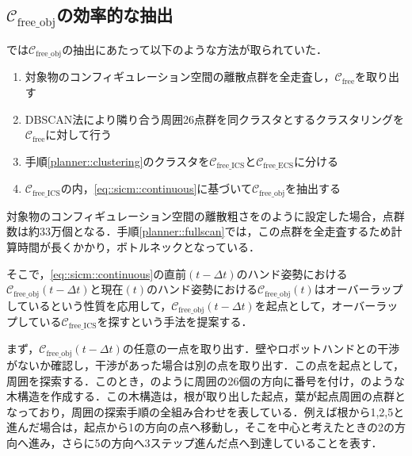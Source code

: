 \documentclass[a4paper,twoside,12pt,papersize, dvipdfmx]{iirthesis}
\begin{document}
\subsection{$\mathcal{C}_{\mathrm{free\_obj}}$の効率的な抽出}\label{subsec::planner::dfs}
\cite{komiyama2021}では$\mathcal{C}_{\mathrm{free\_obj}}$の抽出にあたって以下のような方法が取られていた．
\begin{enumerate}
\item 対象物のコンフィギュレーション空間の離散点群を全走査し，$\mathcal{C}_{\mathrm{free}}$を取り出す \label{planner::fullscan}
\item DBSCAN法\cite{ester1996}により隣り合う周囲26点群を同クラスタとするクラスタリングを$\mathcal{C}_{\mathrm{free}}$に対して行う\label{planner::clustering}
\item 手順\ref{planner::clustering}のクラスタを$\mathcal{C}_{\mathrm{free\_ICS}}$と$\mathcal{C}_{\mathrm{free\_ECS}}$に分ける
\item $\mathcal{C}_{\mathrm{free\_ICS}}$の内，\eqref{eq::sicm::continuous}に基づいて$\mathcal{C}_{\mathrm{free\_obj}}$を抽出する
\end{enumerate}
対象物のコンフィギュレーション空間の離散粗さをのように設定した場合，点群数は約33万個となる．手順\ref{planner::fullscan}では，この点群を全走査するため計算時間が長くかかり，ボトルネックとなっている．\par

そこで，\eqref{eq::sicm::continuous}の直前$(t-\Delta t)$のハンド姿勢における$\mathcal{C}_{\mathrm{free\_obj}}(t-\Delta t)$と現在$(t)$のハンド姿勢における$\mathcal{C}_{\mathrm{free\_obj}}(t)$はオーバーラップしているという性質を応用して，$\mathcal{C}_{\mathrm{free\_obj}}(t-\Delta t)$を起点として，オーバーラップしている$\mathcal{C}_{\mathrm{free\_ICS}}$を探すという手法を提案する．\par

まず，$\mathcal{C}_{\mathrm{free\_obj}}(t-\Delta t)$の任意の一点を取り出す．壁やロボットハンドとの干渉がないか確認し，干渉があった場合は別の点を取り出す．この点を起点として，周囲を探索する．このとき，のように周囲の26個の方向に番号を付け，のような木構造を作成する．この木構造は，根が取り出した起点，葉が起点周囲の点群となっており，周囲の探索手順の全組み合わせを表している．例えば根から1,2,5と進んだ場合は，起点から1の方向の点へ移動し，そこを中心と考えたときの2の方向へ進み，さらに5の方向へ3ステップ進んだ点へ到達していることを表す．\par
\end{document}
